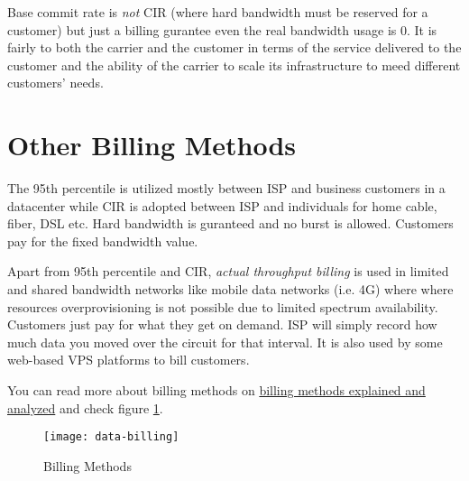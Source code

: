 Base commit rate is \textit{not} CIR (where hard bandwidth must be
reserved for a customer) but just a billing gurantee even the real
bandwidth usage is 0. It is fairly to both the carrier and the
customer in terms of the service delivered to the customer and the
ability of the carrier to scale its infrastructure to meed
different customers' needs.

\section{Other Billing Methods}
\label{sec:other-billing-methods}

The 95th percentile is utilized mostly between ISP and business
customers in a datacenter while CIR is adopted between ISP and
individuals for home cable, fiber, DSL etc. Hard bandwidth is
guranteed and no burst is allowed. Customers pay for the fixed
bandwidth value.

Apart from 95th percentile and CIR, \textit{actual throughput
  billing} is used in limited and shared bandwidth networks like
mobile data networks (i.e. 4G) where where resources
overprovisioning is not possible due to limited spectrum
availability. Customers just pay for what they get on demand. ISP
will simply record how much data you moved over the circuit for
that interval. It is also used by some web-based VPS platforms to
bill customers.

You can read more about billing methods on
\href{https://www.semaphore.com/95th-percentile-bandwidth-metering-explained-and-analyzed/}{billing
  methods explained and analyzed} and check figure
\ref{fig:billing-methods}.

\begin{figure}[t]
  \centering
  \texttt{[image: data-billing]}
  \caption{Billing Methods}
  \label{fig:billing-methods}
\end{figure}

